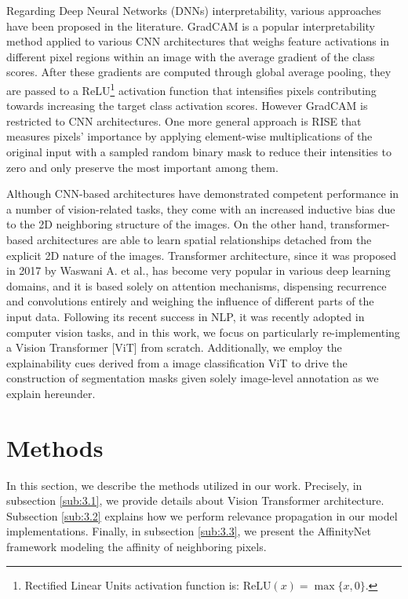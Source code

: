 Regarding Deep Neural Networks (DNNs) interpretability, various approaches have been proposed in the literature. GradCAM \cite{selvaraju2017grad} is a popular interpretability method applied to various CNN architectures that weighs feature activations in different pixel regions within an image with the average gradient of the class scores. After these gradients are computed through global average pooling, they are passed to a ReLU\footnote{Rectified Linear Units activation function is: $\text{ReLU}(x) = \max\{x,0\}$.} activation function that intensifies pixels contributing towards increasing the target class activation scores. However GradCAM is restricted to CNN architectures. One more general approach is RISE \cite{rise} that measures pixels' importance by applying element-wise multiplications of the original input with a sampled random binary mask to reduce their intensities to zero and only preserve the most important among them. 

Although CNN-based architectures have demonstrated competent performance in a number of vision-related tasks, they come with an increased inductive bias due to the 2D neighboring structure of the images. On the other hand, transformer-based architectures are able to learn spatial relationships detached from the explicit 2D nature of the images. Transformer architecture, since it was proposed in 2017 by Waswani A. et al., \cite{vaswani2017attention} has become very popular in various deep learning domains, and it is based solely on attention mechanisms, dispensing recurrence and convolutions entirely and weighing the influence of different parts of the input data. Following its recent success in NLP, it was recently adopted in computer vision tasks, and in this work, we focus on particularly re-implementing a Vision Transformer [ViT] \cite{visiontransformer} from scratch. Additionally, we employ the explainability cues derived from a image classification ViT to drive the construction of segmentation masks given solely image-level annotation as we explain hereunder.

\section{Methods}

In this section, we describe the methods utilized in our work. Precisely, in subsection \ref{sub:3.1}, we provide details about Vision Transformer architecture. Subsection \ref{sub:3.2} explains how we perform relevance propagation in our model implementations. Finally, in subsection \ref{sub:3.3}, we present the AffinityNet framework modeling the affinity of neighboring pixels.



